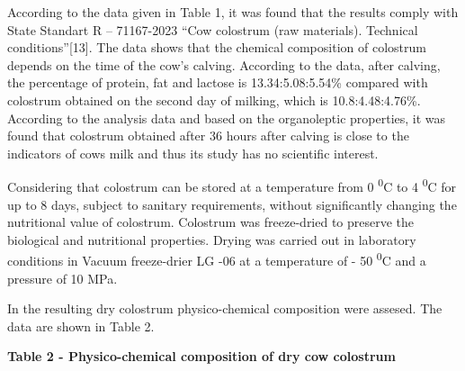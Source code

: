 According to the data given in Table 1, it was found that the results
comply with State Standart R -- 71167-2023 ``Cow colostrum (raw
materials). Technical conditions''{[}13{]}. The data shows that the
chemical composition of colostrum depends on the time of the cow's
calving. According to the data, after calving, the percentage of
protein, fat and lactose is 13.34:5.08:5.54\% compared with colostrum
obtained on the second day of milking, which is 10.8:4.48:4.76\%.
According to the analysis data and based on the organoleptic properties,
it was found that colostrum obtained after 36 hours after calving is
close to the indicators of cow\textquotesingle s milk and thus its study
has no scientific interest.

Considering that colostrum can be stored at a temperature from 0
\textsuperscript{0}C to 4 \textsuperscript{0}C for up to 8 days, subject
to sanitary requirements, without significantly changing the nutritional
value of colostrum. Colostrum was freeze-dried to preserve the
biological and nutritional properties. Drying was carried out in
laboratory conditions in Vacuum freeze-drier LG -06 at a temperature of
- 50 \textsuperscript{0}C and a pressure of 10 MPa.

In the resulting dry colostrum physico-chemical composition were
assesed. The data are shown in Table 2.

{\bfseries Table 2 - Physico-chemical composition of dry cow colostrum}

